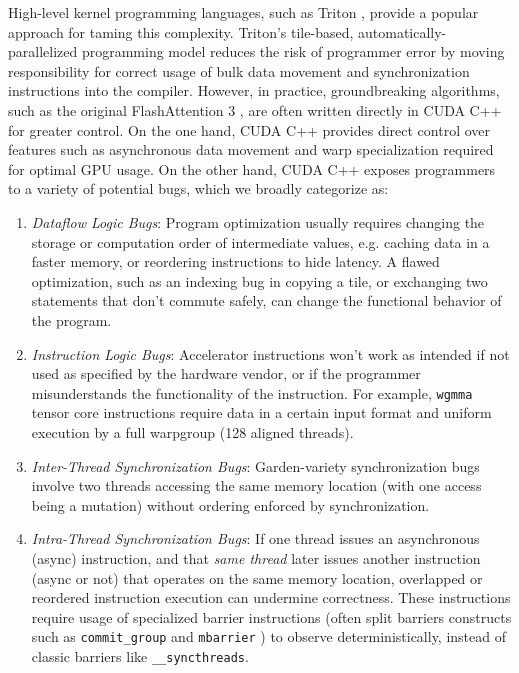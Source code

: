 High-level kernel programming languages, such as Triton \cite{triton}, provide a popular approach for taming this complexity.
Triton's tile-based, automatically-parallelized programming model reduces the risk of programmer error by moving responsibility for correct usage of bulk data movement and synchronization instructions into the compiler.
However, in practice, groundbreaking algorithms, such as the original FlashAttention 3 \cite{shah2024flashattention3fastaccurateattention}, are often written directly in CUDA C++ for greater control.
On the one hand, CUDA C++ provides direct control over features such as asynchronous data movement and warp specialization required for optimal GPU usage.
On the other hand, CUDA C++ exposes programmers to a variety of potential bugs, which we broadly categorize as:
\vspace{-0.2em}
\begin{enumerate}
    \item \emph{Dataflow Logic Bugs}: Program optimization usually requires changing the storage or computation order of intermediate values, e.g. caching data in a faster memory, or reordering instructions to hide latency.
    A flawed optimization, such as an indexing bug in copying a tile, or exchanging two statements that don't commute safely, can change the functional behavior of the program.
    \item \emph{Instruction Logic Bugs}: Accelerator instructions won't work as intended if not used as specified by the hardware vendor, or if the programmer misunderstands the functionality of the instruction.
    For example, \texttt{wgmma} tensor core instructions require data in a certain input format and uniform execution by a full warpgroup (128 aligned threads).
    \item \emph{Inter-Thread Synchronization Bugs}: Garden-variety synchronization bugs involve two threads accessing the same memory location (with one access being a mutation) without ordering enforced by synchronization.
    \item \emph{Intra-Thread Synchronization Bugs}: If one thread issues an asynchronous (async) instruction, and that \emph{same thread} later issues another instruction (async or not) that operates on the same memory location, overlapped or reordered instruction execution can undermine correctness.
    These instructions require usage of specialized barrier instructions
    (often split barriers constructs such as \texttt{commit\_group} and \texttt{mbarrier} \cite{ptx})
    to observe deterministically,
    instead of classic barriers like \texttt{\_\_syncthreads}.
\end{enumerate}
\vspace{-0.3em}

